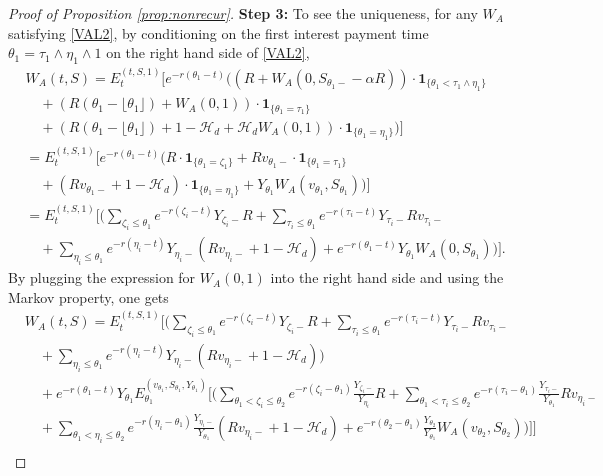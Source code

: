 \documentclass[final,pdftex]{ectaart}
\theoremstyle{plain}
\begin{document}
\begin{appendices}
\begin{proof}[Proof of Proposition \ref{prop:nonrecur}]
	{\flushleft\bf Step 3:} To see the uniqueness, for any $W_A$ satisfying \eqref{VAL2}, by conditioning on the first interest payment time $\theta_1=\tau_1\land\eta_1\land1$ on the right hand side of \eqref{VAL2},
	\begin{align*}
	&W_A(t,S)=E_t^{(t,S,1)}\Bigg[e^{-r(\theta_1-t)}\Bigg((R+W_A(0,S_{\theta_1-}-\alpha R))\cdot\mathbf{1}_{\{\theta_1<\tau_1\land\eta_1\}}\\
	&\quad+(R(\theta_1-\lfloor\theta_1\rfloor)+W_A(0,1))\cdot\mathbf{1}_{\{\theta_1=\tau_1\}}\\
	&\quad+(R(\theta_1-\lfloor\theta_1\rfloor)+1-\mathcal{H}_d+\mathcal{H}_d W_A(0,1))\cdot \mathbf{1}_{\{\theta_1=\eta_1\}}\Bigg)\Bigg]\\
	&=E_t^{(t,S,1)}\Bigg[e^{-r(\theta_1-t)}\Bigg(R\cdot\mathbf{1}_{\{\theta_1=\zeta_1\}}+Rv_{\theta_1-}\cdot\mathbf{1}_{\{\theta_1=\tau_1\}}\\
	&\quad+(Rv_{\theta_1-}+1-\mathcal{H}_d)\cdot \mathbf{1}_{\{\theta_1=\eta_1\}}+Y_{\theta_1} W_A(v_{\theta_1},S_{\theta_1})\Bigg)\Bigg]\\
	&=E_t^{(t,S,1)}\Bigg[\Bigg(\sum_{\zeta_i\le\theta_1}e^{-r(\zeta_i-t)}Y_{\zeta_i-}R+\sum_{\tau_i\le\theta_1}e^{-r(\tau_i-t)}Y_{\tau_i-}Rv_{\tau_i-}\\
	&\quad+\sum_{\eta_i\le\theta_1}e^{-r(\eta_i-t)}Y_{\eta_i-}(Rv_{\eta_i-}+1-\mathcal{H}_d)+e^{-r(\theta_1-t)}Y_{\theta_1} W_A(0,S_{\theta_1})\Bigg)\Bigg].
	\end{align*}
	By plugging the expression for $W_A(0,1)$ into the right hand side and using the Markov property, one gets
	\begin{align*}
	&W_A(t,S)=E_t^{(t,S,1)}\Bigg[\Bigg(\sum_{\zeta_i\le\theta_1}e^{-r(\zeta_i-t)}Y_{\zeta_i-}R+\sum_{\tau_i\le\theta_1}e^{-r(\tau_i-t)}Y_{\tau_i-}Rv_{\tau_i-}\\
	&\quad+\sum_{\eta_i\le\theta_1}e^{-r(\eta_i-t)}Y_{\eta_i-}(Rv_{\eta_i-}+1-\mathcal{H}_d)\Bigg)\\
	&\quad+e^{-r(\theta_1-t)}Y_{\theta_1} E_{\theta_1}^{(v_{\theta_1},S_{\theta_1},Y_{\theta_1})}\Bigg[\Bigg(\sum_{\theta_1<\zeta_i\le\theta_2}e^{-r(\zeta_i-\theta_1)}\frac{Y_{\zeta_i-}}{Y_{\eta_i}}R+\sum_{\theta_1<\tau_i\le\theta_2}e^{-r(\tau_i-\theta_1)}\frac{Y_{\tau_i-}}{Y_{\theta_1}}Rv_{\eta_i-}\\
	&\quad+\sum_{\theta_1<\eta_i\le\theta_2}e^{-r(\eta_i-\theta_1)}\frac{Y_{\eta_i-}}{Y_{\theta_1}}(Rv_{\eta_i-}+1-\mathcal{H}_d)+e^{-r(\theta_2-\theta_1)}\frac{Y_{\theta_2}}{Y_{\theta_1}} W_A(v_{\theta_2},S_{\theta_2})\Bigg)\Bigg]\Bigg]\\

\end{align*}
\end{proof}
\end{appendices}
\end{document}
